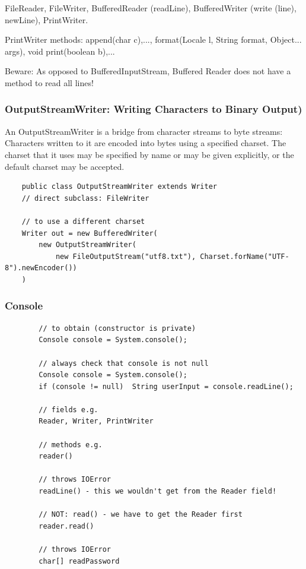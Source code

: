 \documentclass{scrartcl}
\begin{document}
    FileReader, FileWriter, BufferedReader (readLine), BufferedWriter (write (line), newLine), PrintWriter.

    PrintWriter methods: append(char c),..., format(Locale l, String format, Object... args), void print(boolean b),...

    Beware: As opposed to BufferedInputStream, Buffered Reader does not have a method to read all lines!

\subsubsection{OutputStreamWriter: Writing Characters to Binary Output)}

An OutputStreamWriter is a bridge from character streams to byte streams: Characters written to it are encoded into bytes using a specified charset. The charset that it uses may be specified by name or may be given explicitly, or the default charset may be accepted.

\begin{lstlisting}
    public class OutputStreamWriter extends Writer
    // direct subclass: FileWriter

    // to use a different charset
    Writer out = new BufferedWriter(
        new OutputStreamWriter(
            new FileOutputStream("utf8.txt"), Charset.forName("UTF-8").newEncoder())
    )

\end{lstlisting}

\subsubsection{Console}

    \begin{lstlisting}
        // to obtain (constructor is private)
        Console console = System.console();

        // always check that console is not null
        Console console = System.console();
        if (console != null)  String userInput = console.readLine();

        // fields e.g.
        Reader, Writer, PrintWriter

        // methods e.g.
        reader()

        // throws IOError
        readLine() - this we wouldn't get from the Reader field!

        // NOT: read() - we have to get the Reader first
        reader.read()

        // throws IOError
        char[] readPassword
    \end{lstlisting}
\end{document}
